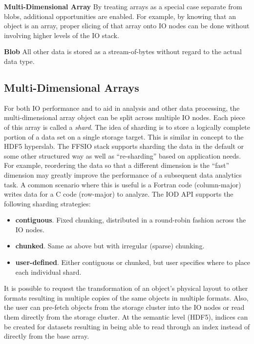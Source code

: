 \documentclass[conference]{IEEEtran} \pdfpagewidth=8.5in
\begin{document}
\textbf{Multi-Dimensional Array}
By treating arrays as a special case separate from blobs, additional
opportunities are enabled. For example, by knowing that an object is an array,
proper slicing of that array onto IO nodes can be done without involving higher
levels of the IO stack.

\textbf{Blob}
All other data is stored as a stream-of-bytes without regard to the actual
data type.

\subsection{Multi-Dimensional Arrays}

For both IO performance and to aid in analysis and other data processing, the
multi-dimensional array object can be split across multiple IO nodes. Each
piece of this array is called a {\em shard}.  The idea of sharding is to store
a logically complete portion of a data set on a single storage target. This is
similar in concept to the HDF5 hyperslab.  The FFSIO stack supports sharding
the data in the default or some other structured way as well as ``re-sharding''
based on application needs. For example, reordering the data so that a
different dimension is the ``fast'' dimension may greatly improve the
performance of a subsequent data analytics task. A common scenario where this
is useful is a Fortran code (column-major) writes data for a C code (row-major)
to analyze.  The IOD API supports the following sharding strategies:

\begin{itemize}
\item
  \textbf{contiguous}. Fixed chunking, distributed in a round-robin
  fashion across the IO nodes.
\item
  \textbf{chunked}. Same as above but with irregular (sparse) chunking.
\item
  \textbf{user-defined}. Either contiguous or chunked, but user specifies
  where to place each individual shard.
\end{itemize}

It is possible to request the transformation of an object's physical
layout to other formats resulting in multiple copies of the same objects in
multiple formats. Also, the user can pre-fetch objects from the storage cluster
into the IO nodes or read them directly from the storage cluster. At the
semantic level (HDF5), indices can be created for datasets resulting in being
able to read through an index instead of directly from the base array.
\end{document}
